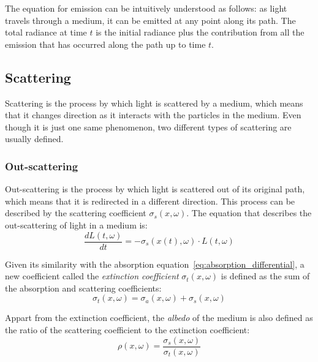 \begin{observacion}
    The equation for emission can be intuitively understood as follows: as light travels through a medium, it can be emitted at any point along its path. The total radiance at time $t$ is the initial radiance plus the contribution from all the emission that has occurred along the path up to time $t$.
\end{observacion}

\subsection{Scattering}

Scattering is the process by which light is scattered by a medium, which means that it changes direction as it interacts with the particles in the medium. Even though it is just one same phenomenon, two different types of scattering are usually defined.

\subsubsection{Out-scattering}

Out-scattering is the process by which light is scattered out of its original path, which means that it is redirected in a different direction. This process can be described by the scattering coefficient $\sigma_s(x, \omega)$. The equation that describes the out-scattering of light in a medium is:
\begin{equation}\label{eq:out_scattering_differential}
\frac{dL(t,\omega)}{dt} = -\sigma_s(x(t), \omega) \cdot L(t,\omega)
\end{equation}

Given its similarity with the absorption equation~\eqref{eq:absorption_differential}, a new coefficient called the \emph{extinction coefficient} $\sigma_t(x, \omega)$ is defined as the sum of the absorption and scattering coefficients:
\begin{equation*}
\sigma_t(x, \omega) = \sigma_a(x, \omega) + \sigma_s(x, \omega)
\end{equation*}

Appart from the extinction coefficient, the \emph{albedo} of the medium is also defined as the ratio of the scattering coefficient to the extinction coefficient:
\begin{equation*}
\rho(x, \omega) = \frac{\sigma_s(x, \omega)}{\sigma_t(x, \omega)}
\end{equation*}

